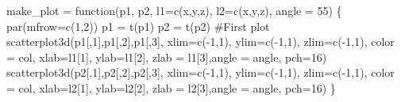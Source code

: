 \documentclass[
  letterpaper,
  DIV=11,
  numbers=noendperiod]{scrartcl}
\newenvironment{Shaded}{\begin{snugshade}}{\end{snugshade}}
\newcommand{\AttributeTok}[1]{\textcolor[rgb]{0.40,0.45,0.13}{#1}}
\newcommand{\CommentTok}[1]{\textcolor[rgb]{0.37,0.37,0.37}{#1}}
\newcommand{\ControlFlowTok}[1]{\textcolor[rgb]{0.00,0.23,0.31}{#1}}
\newcommand{\DecValTok}[1]{\textcolor[rgb]{0.68,0.00,0.00}{#1}}
\newcommand{\FunctionTok}[1]{\textcolor[rgb]{0.28,0.35,0.67}{#1}}
\newcommand{\NormalTok}[1]{\textcolor[rgb]{0.00,0.23,0.31}{#1}}
\newcommand{\OtherTok}[1]{\textcolor[rgb]{0.00,0.23,0.31}{#1}}
\newcommand{\SpecialCharTok}[1]{\textcolor[rgb]{0.37,0.37,0.37}{#1}}
\newcommand{\StringTok}[1]{\textcolor[rgb]{0.13,0.47,0.30}{#1}}
\begin{document}
\begin{Shaded}
\begin{Highlighting}[]
\NormalTok{make\_plot }\OtherTok{=} \ControlFlowTok{function}\NormalTok{(p1, p2, }\AttributeTok{l1=}\FunctionTok{c}\NormalTok{(}\StringTok{\textquotesingle{}x\textquotesingle{}}\NormalTok{,}\StringTok{\textquotesingle{}y\textquotesingle{}}\NormalTok{,}\StringTok{\textquotesingle{}z\textquotesingle{}}\NormalTok{), }\AttributeTok{l2=}\FunctionTok{c}\NormalTok{(}\StringTok{\textquotesingle{}x\textquotesingle{}}\NormalTok{,}\StringTok{\textquotesingle{}y\textquotesingle{}}\NormalTok{,}\StringTok{\textquotesingle{}z\textquotesingle{}}\NormalTok{), }\AttributeTok{angle =} \DecValTok{55}\NormalTok{) \{}
  \FunctionTok{par}\NormalTok{(}\AttributeTok{mfrow=}\FunctionTok{c}\NormalTok{(}\DecValTok{1}\NormalTok{,}\DecValTok{2}\NormalTok{))}
\NormalTok{  p1 }\OtherTok{=} \FunctionTok{t}\NormalTok{(p1)}
\NormalTok{  p2 }\OtherTok{=} \FunctionTok{t}\NormalTok{(p2)}
  \CommentTok{\#First plot}
  \FunctionTok{scatterplot3d}\NormalTok{(p1[,}\DecValTok{1}\NormalTok{],p1[,}\DecValTok{2}\NormalTok{],p1[,}\DecValTok{3}\NormalTok{], }
                \AttributeTok{xlim=}\FunctionTok{c}\NormalTok{(}\SpecialCharTok{{-}}\DecValTok{1}\NormalTok{,}\DecValTok{1}\NormalTok{), }\AttributeTok{ylim=}\FunctionTok{c}\NormalTok{(}\SpecialCharTok{{-}}\DecValTok{1}\NormalTok{,}\DecValTok{1}\NormalTok{), }\AttributeTok{zlim=}\FunctionTok{c}\NormalTok{(}\SpecialCharTok{{-}}\DecValTok{1}\NormalTok{,}\DecValTok{1}\NormalTok{), }
                \AttributeTok{color =}\NormalTok{ col,}
                \AttributeTok{xlab=}\NormalTok{l1[}\DecValTok{1}\NormalTok{], }\AttributeTok{ylab=}\NormalTok{l1[}\DecValTok{2}\NormalTok{], }\AttributeTok{zlab =}\NormalTok{ l1[}\DecValTok{3}\NormalTok{],}\AttributeTok{angle =}\NormalTok{ angle, }\AttributeTok{pch=}\DecValTok{16}\NormalTok{)}
  \FunctionTok{scatterplot3d}\NormalTok{(p2[,}\DecValTok{1}\NormalTok{],p2[,}\DecValTok{2}\NormalTok{],p2[,}\DecValTok{3}\NormalTok{], }
                \AttributeTok{xlim=}\FunctionTok{c}\NormalTok{(}\SpecialCharTok{{-}}\DecValTok{1}\NormalTok{,}\DecValTok{1}\NormalTok{), }\AttributeTok{ylim=}\FunctionTok{c}\NormalTok{(}\SpecialCharTok{{-}}\DecValTok{1}\NormalTok{,}\DecValTok{1}\NormalTok{), }\AttributeTok{zlim=}\FunctionTok{c}\NormalTok{(}\SpecialCharTok{{-}}\DecValTok{1}\NormalTok{,}\DecValTok{1}\NormalTok{), }
                \AttributeTok{color =}\NormalTok{ col,}
                \AttributeTok{xlab=}\NormalTok{l2[}\DecValTok{1}\NormalTok{], }\AttributeTok{ylab=}\NormalTok{l2[}\DecValTok{2}\NormalTok{], }\AttributeTok{zlab =}\NormalTok{ l2[}\DecValTok{3}\NormalTok{],}\AttributeTok{angle =}\NormalTok{ angle, }\AttributeTok{pch=}\DecValTok{16}\NormalTok{)}
\NormalTok{\}}
\end{Highlighting}
\end{Shaded}
\end{document}
